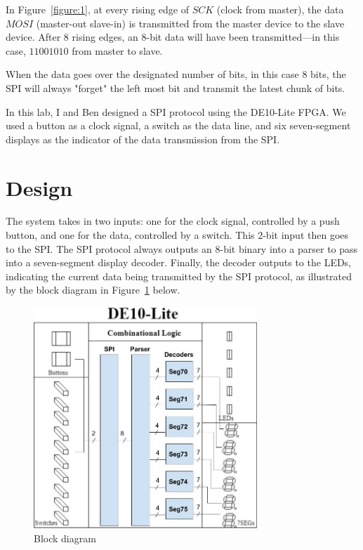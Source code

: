 \documentclass[12pt]{article}
\begin{document}
In Figure~\ref{figure:1}, at every rising edge of $SCK$ (clock from master), the data $MOSI$ (master-out slave-in) is transmitted from the master device to the slave device. After 8 rising edges, an 8-bit data will have been transmitted---in this case, $11001010$ from master to slave.

When the data goes over the designated number of bits, in this case 8 bits, the SPI will always "forget" the left most bit and transmit the latest chunk of bits.

In this lab, I and Ben designed a SPI protocol using the DE10-Lite FPGA. We used a button as a clock signal, a switch as the data line, and six seven-segment displays as the indicator of the data transmission from the SPI.

\section{Design}

The system takes in two inputs: one for the clock signal, controlled by a push button, and one for the data, controlled by a switch. This 2-bit input then goes to the SPI. The SPI protocol always outputs an 8-bit binary into a parser to pass into a seven-segment display decoder. Finally, the decoder outputs to the LEDs, indicating the current data being transmitted by the SPI protocol, as illustrated by the block diagram in Figure~\ref{figure:2} below.

\begin{figure}[ht]
  \centering
  \includegraphics[width=0.75\textwidth]{lab5_block_diagram.png}
  \caption{Block diagram}
  \label{figure:2}
\end{figure}
\end{document}
